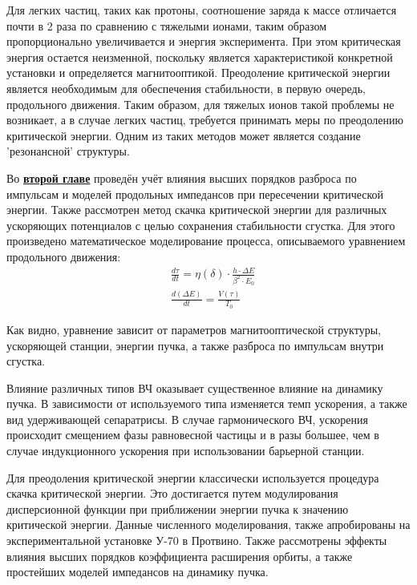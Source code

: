 \par Для легких частиц, таких как протоны, соотношение заряда к массе отличается почти в 2 раза по сравнению с тяжелыми ионами, таким образом пропорционально увеличивается и энергия эксперимента. При этом критическая энергия остается неизменной, поскольку является характеристикой конкретной установки и определяется магнитооптикой. Преодоление критической энергии является необходимым для обеспечения стабильности, в первую очередь, продольного движения. Таким образом, для тяжелых ионов такой проблемы не возникает, а в случае легких частиц, требуется принимать меры по преодолению критической энергии. Одним из таких методов может является создание 'резонансной' структуры. 

\par Во \underline{\textbf{второй главе}} проведён учёт влияния высших порядков разброса по импульсам и моделей продольных импедансов при пересечении критической энергии. Также рассмотрен метод скачка критической энергии для различных ускоряющих потенциалов с целью сохранения стабильности сгустка. Для этого произведено математическое моделирование процесса, описываемого уравнением продольного движения:
\[
\begin{aligned}
& \frac{d \tau}{d t}=\eta(\delta) \cdot \frac{h \cdot \Delta E}{\beta^2 \cdot E_0} \\
& \frac{d(\Delta E)}{d t}=\frac{V(\tau)}{T_0}
\end{aligned}
\label{long}
\]

\noindent Как видно, уравнение зависит от параметров магнитооптической структуры, ускоряющей станции, энергии пучка, а также разброса по импульсам внутри сгустка.

\par Влияние различных типов ВЧ оказывает существенное влияние на динамику пучка. В зависимости от используемого типа изменяется темп ускорения, а также вид удерживающей сепаратрисы. В случае гармонического ВЧ, ускорения происходит смещением фазы равновесной частицы и в разы большее, чем в случае индукционного ускорения при использовании барьерной станции.

\par Для преодоления критической энергии классически используется процедура скачка критической энергии. Это достигается путем модулирования дисперсионной функции при приближении энергии пучка к значению критической энергии. Данные численного моделирования, также апробированы на экспериментальной установке У-70 в Протвино. Также рассмотрены эффекты влияния высших порядков коэффициента расширения орбиты, а также простейших моделей импедансов на динамику пучка.

